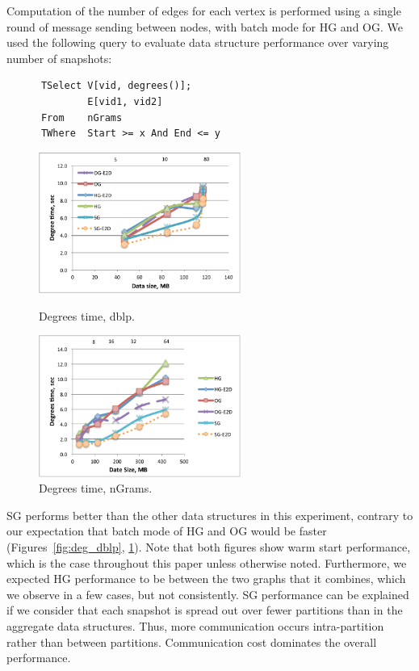 Computation of the number of edges for each vertex is performed using
a single round of message sending between nodes, with batch mode for
HG and OG.  We used the following query to evaluate data structure
performance over varying number of snapshots:

\begin{small}
\begin{verbatim}
      TSelect V[vid, degrees()];
              E[vid1, vid2]
      From    nGrams
      TWhere  Start >= x And End <= y
\end{verbatim}
\end{small}

\begin{figure}[t]
\centering
\begin{minipage}{3in}
  \centering
  \includegraphics[width=2.6in]{figs/degrees_dblp.pdf}
  \vspace{-0.1in}
  \caption{Degrees time, dblp.}
  \label{fig:deg_dblp}
  \vspace{-0.1in}
\end{minipage}
\begin{minipage}{3in}
  \centering
\includegraphics[width=2.6in]{figs/degrees_ngrams.pdf}
  \vspace{-0.1in}
\caption{Degrees time, nGrams.}
\label{fig:deg_ngrams}
  \vspace{-0.1in}
\end{minipage}
\end{figure}

SG performs better than the other data structures in this experiment,
contrary to our expectation that batch mode of HG and OG would be
faster (Figures~\ref{fig:deg_dblp}, \ref{fig:deg_ngrams}).  Note that
both figures show warm start performance, which is the case throughout
this paper unless otherwise noted.  Furthermore, we expected HG
performance to be between the two graphs that it combines, which we
observe in a few cases, but not consistently.  SG performance can be
explained if we consider that each snapshot is spread out over fewer
partitions than in the aggregate data structures.  Thus, more
communication occurs intra-partition rather than between partitions.
Communication cost dominates the overall performance.


